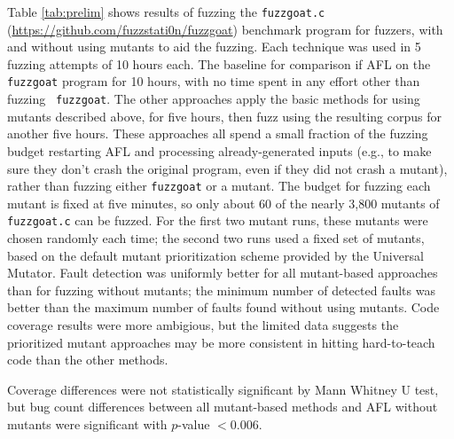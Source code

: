 Table \ref{tab:prelim} shows results of fuzzing the {\tt fuzzgoat.c}
(\url{https://github.com/fuzzstati0n/fuzzgoat}) benchmark program for
fuzzers, with and without using mutants to aid the fuzzing.  Each
technique was used in 5 fuzzing attempts of 10 hours each.  The
baseline for comparison if AFL on the {\tt fuzzgoat} program for 10
hours, with no time spent in any effort other than fuzzing {\tt
  fuzzgoat}.  The other approaches apply the basic methods for using
mutants described above, for five hours, then fuzz using the resulting
corpus for another five hours.  These approaches all spend a small
fraction of the fuzzing budget restarting AFL and processing
already-generated inputs (e.g., to make sure they don't crash the
original program, even if they did not crash a mutant), rather than
fuzzing either {\tt fuzzgoat} or a mutant.  The budget for fuzzing
each mutant is fixed at five minutes, so only about 60 of the nearly
3,800 mutants of {\tt fuzzgoat.c} can be fuzzed.  For the first two
mutant runs, these mutants were chosen randomly each time; the second
two runs used a fixed set of mutants, based on the default mutant
prioritization scheme provided by the Universal Mutator.  Fault
detection was uniformly better for all mutant-based approaches than
for fuzzing without mutants; the minimum number of detected faults was
better than the maximum number of faults found without using mutants.
Code coverage results were more ambigious, but the limited data
suggests the prioritized mutant approaches may be more consistent in
hitting hard-to-teach code than the other methods.

Coverage differences were not statistically significant by Mann
Whitney U test, but bug count differences between all mutant-based methods and AFL
without mutants were significant with $p$-value $< 0.006$.